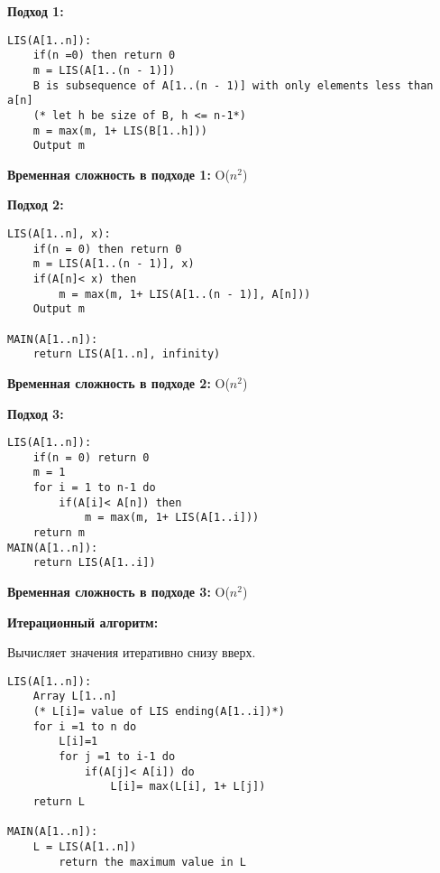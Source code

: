 \textbf{Подход 1:}
\vspace{\baselineskip}
\begin{tcolorbox}
\begin{verbatim}     
LIS(A[1..n]):
    if(n =0) then return 0
    m = LIS(A[1..(n - 1)])
    B is subsequence of A[1..(n - 1)] with only elements less than a[n]
    (* let h be size of B, h <= n-1*)
    m = max(m, 1+ LIS(B[1..h]))
    Output m
\end{verbatim}
\end{tcolorbox}
\vspace{\baselineskip}
\textbf{Временная сложность в подходе 1:} O($n^2$)
\vspace{\baselineskip}

\textbf{Подход 2:}
\vspace{\baselineskip}
\begin{tcolorbox}
\begin{verbatim}     
LIS(A[1..n], x):
    if(n = 0) then return 0
    m = LIS(A[1..(n - 1)], x)
    if(A[n]< x) then
        m = max(m, 1+ LIS(A[1..(n - 1)], A[n]))
    Output m
    
MAIN(A[1..n]):
    return LIS(A[1..n], infinity)
\end{verbatim}
\end{tcolorbox}
\vspace{\baselineskip}

\textbf{Временная сложность в подходе 2:} O($n^2$)
\vspace{\baselineskip}

\textbf{Подход 3:}
\vspace{\baselineskip}
\begin{verbatim}     
LIS(A[1..n]):
    if(n = 0) return 0
    m = 1 
    for i = 1 to n-1 do
        if(A[i]< A[n]) then
            m = max(m, 1+ LIS(A[1..i]))
    return m
MAIN(A[1..n]):
    return LIS(A[1..i])
\end{verbatim}
\vspace{\baselineskip}

\textbf{Временная сложность в подходе 3:} O($n^2$)
\vspace{\baselineskip}

\textbf{Итерационный алгоритм:}
\vspace{\baselineskip}

Вычисляет значения итеративно снизу вверх.
\vspace{\baselineskip}
\begin{tcolorbox}
\begin{verbatim}
LIS(A[1..n]):
    Array L[1..n]
    (* L[i]= value of LIS ending(A[1..i])*)
    for i =1 to n do
        L[i]=1
        for j =1 to i-1 do
            if(A[j]< A[i]) do
                L[i]= max(L[i], 1+ L[j])
    return L
    
MAIN(A[1..n]):
    L = LIS(A[1..n])
        return the maximum value in L
\end{verbatim}
\end{tcolorbox}
\vspace{\baselineskip}

